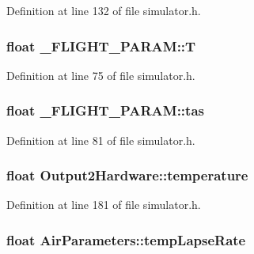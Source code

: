 \-Definition at line 132 of file simulator.\-h.

\hypertarget{group___h_i_t_l_plugin_ga6c3abbd8306a5eb69384ca36f338991b}{
\subsubsection[{\-T}]{\setlength{\rightskip}{0pt plus 5cm}float {\bf \-\_\-\-F\-L\-I\-G\-H\-T\-\_\-\-P\-A\-R\-A\-M\-::\-T}}}\label{group___h_i_t_l_plugin_ga6c3abbd8306a5eb69384ca36f338991b}


\-Definition at line 75 of file simulator.\-h.

\hypertarget{group___h_i_t_l_plugin_gad3fafd24c05ec4da9b2b230dfe6eec23}{
\subsubsection[{tas}]{\setlength{\rightskip}{0pt plus 5cm}float {\bf \-\_\-\-F\-L\-I\-G\-H\-T\-\_\-\-P\-A\-R\-A\-M\-::tas}}}\label{group___h_i_t_l_plugin_gad3fafd24c05ec4da9b2b230dfe6eec23}


\-Definition at line 81 of file simulator.\-h.

\hypertarget{group___h_i_t_l_plugin_ga925c7971d40c91b63e480e5f89096747}{
\subsubsection[{temperature}]{\setlength{\rightskip}{0pt plus 5cm}float {\bf \-Output2\-Hardware\-::temperature}}}\label{group___h_i_t_l_plugin_ga925c7971d40c91b63e480e5f89096747}


\-Definition at line 181 of file simulator.\-h.

\hypertarget{group___h_i_t_l_plugin_gae5608554d84c53cb81499d63b9381f9f}{
\subsubsection[{temp\-Lapse\-Rate}]{\setlength{\rightskip}{0pt plus 5cm}float {\bf \-Air\-Parameters\-::temp\-Lapse\-Rate}}}\label{group___h_i_t_l_plugin_gae5608554d84c53cb81499d63b9381f9f}


